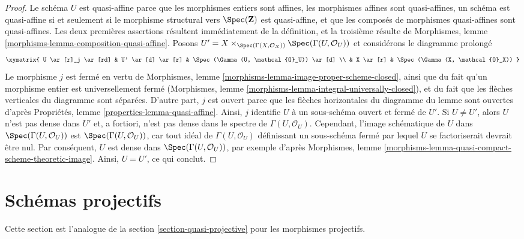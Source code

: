 \begin{proof}
Le schéma $U$ est quasi-affine parce que les morphismes entiers sont affines,
les morphismes affines sont quasi-affines, un schéma est quasi-affine si et seulement si
le morphisme structural vers $\Spec(\mathbf{Z})$ est quasi-affine, et que
les composés de morphismes quasi-affines sont quasi-affines.
Les deux premières assertions résultent immédiatement de la définition,
et la troisième résulte de
Morphismes, lemme \ref{morphisms-lemma-composition-quasi-affine}.
Posons $U' =
X \times_{\Spec(\Gamma(X, \mathcal{O}_X))} \Spec(\Gamma(U, \mathcal{O}_U))$
et considérons le diagramme prolongé
$$
\xymatrix{
U \ar[r]_j \ar[rd] & U' \ar[d] \ar[r] &
\Spec(\Gamma(U, \mathcal{O}_U)) \ar[d] \\
& X \ar[r] & \Spec(\Gamma(X, \mathcal{O}_X))
}
$$
Le morphisme $j$ est fermé en vertu de
Morphismes, lemme \ref{morphisms-lemma-image-proper-scheme-closed},
ainsi que du fait qu'un morphisme entier est universellement fermé
(Morphismes, lemme \ref{morphisms-lemma-integral-universally-closed}),
et du fait que les flèches verticales du diagramme sont séparées.
D'autre part, $j$ est ouvert parce que les flèches
horizontales du diagramme du lemme sont ouvertes d'après
Propriétés, lemme \ref{properties-lemma-quasi-affine}.
Ainsi, $j$ identifie $U$ à un sous-schéma ouvert et fermé de $U'$.
Si $U \not = U'$, alors $U$ n'est pas dense dans $U'$ et, a fortiori,
n'est pas dense dans le spectre de $\Gamma(U, \mathcal{O}_U)$.
Cependant, l'image schématique de
$U$ dans $\Spec(\Gamma(U, \mathcal{O}_U))$ est $\Spec(\Gamma(U, \mathcal{O}_U))$,
car tout idéal de $\Gamma(U, \mathcal{O}_U)$
définissant un sous-schéma fermé par lequel $U$
se factoriserait devrait être nul.
Par conséquent, $U$ est dense dans $\Spec(\Gamma(U, \mathcal{O}_U))$, par exemple d'après
Morphismes, lemme \ref{morphisms-lemma-quasi-compact-scheme-theoretic-image}.
Ainsi, $U = U'$, ce qui conclut.
\end{proof}









\section{Schémas projectifs}
\label{section-projective}

\noindent
Cette section est l'analogue de la section \ref{section-quasi-projective}
pour les morphismes projectifs.

